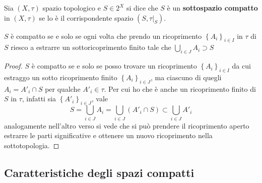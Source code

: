 \begin{definition}
	Sia $(X, \tau)$ spazio topologico e $S \in 2^X$ si dice che $S$ è un \textbf{sottospazio compatto} in $(X, \tau)$ se lo è il corrispondente spazio $(S, \tau|_S)$.
\end{definition} 

\begin{remark}
	$S$ è compatto se e solo se ogni volta che prendo un ricoprimento $\left\{A_i\right\}_{i \in I}$ in $\tau$ di $S$ riesco a estrarre un sottoricoprimento finito tale che $\bigcup_{i \in J} A_i \supset S$ 
	\begin{proof}
		$S$ è compatto se e solo se posso trovare un ricoprimento $\left\{A_i\right\}_{i \in I}$ da cui estraggo un sotto ricoprimento finito $\left\{A_i\right\}_{i \in J}$, ma ciascuno di quegli $A_i = A'_i \cap S$ per qualche $A'_i \in \tau$. Per cui ho che è anche un ricoprimento finito di $S$ in $\tau$, infatti sia $\left\{A'_i\right\}_{i\in J}$, vale 
		\begin{equation*}
			S = \bigcup_{i \in J} A_i = \bigcup_{i \in J} (A'_i \cap S)  \subset  \bigcup_{i \in J} A'_i
		\end{equation*}
		analogamente nell'altro verso si vede che si può prendere il ricoprimento aperto estrarre le parti significative e ottenere un nuovo ricoprimento nella sottotopologia.
	\end{proof}
\end{remark}



\subsection{\textcolor{TopGener}{\textbf{Caratteristiche degli spazi compatti}}}



